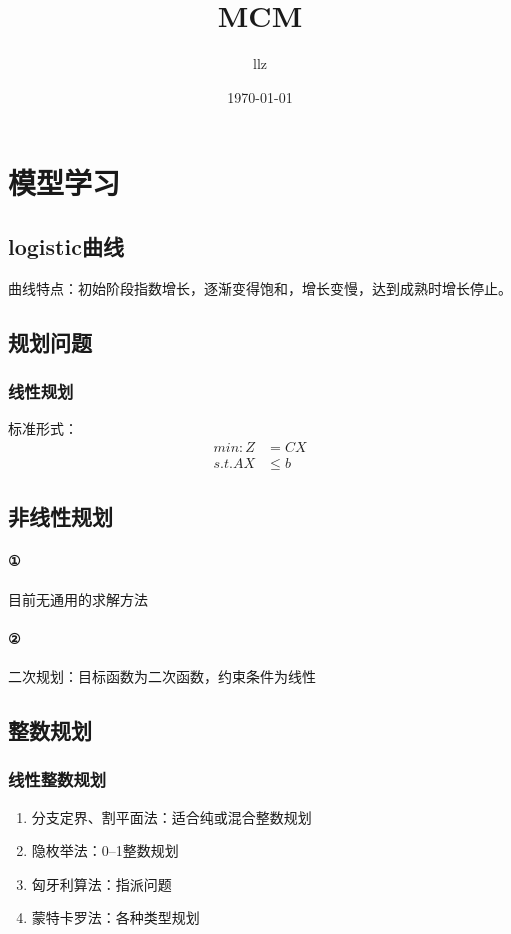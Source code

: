 \documentclass[12pt,a4paper]{article}
\title{MCM}
\author{llz}
\date{\today}
\begin{document}
\kaishu
\maketitle

\section{模型学习} 

\subsection{logistic曲线}
曲线特点：初始阶段指数增长，逐渐变得饱和，增长变慢，达到成熟时增长停止。

\subsection{规划问题}
\subsubsection{线性规划}
标准形式：
\begin{displaymath}
\begin{split}
   min:Z &= CX\\
   s.t.AX &\le b
\end{split}
\end{displaymath}
\subsection{非线性规划}
\paragraph{①}目前无通用的求解方法\\
\paragraph {②}二次规划：目标函数为二次函数，约束条件为线性
\subsection{整数规划}
\subsubsection{线性整数规划}
\begin{enumerate}
\item 分支定界、割平面法：适合纯或混合整数规划
\item 隐枚举法：0--1整数规划
\item 匈牙利算法：指派问题
\item 蒙特卡罗法：各种类型规划
\end{enumerate}
\end{document}
